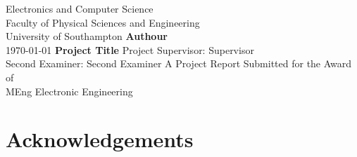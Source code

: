 \documentclass[12pt]{book}
\title{\docTitle{}}
\author{\docAuthor}
\date{\today}
\newcommand{\docSubtitle}{Project Title}
\newcommand{\docAuthor}{Authour}
\newcommand{\docSupervisor}{Supervisor}
\newcommand{\docSecondExaminer}{Second Examiner}
\newcommand{\docDegree}{MEng Electronic Engineering}
\begin{document}
\frontmatter

\begin{titlepage}
\begin{center}
        \vfill
        \Large
        Electronics and Computer Science\\
        Faculty of Physical Sciences and Engineering\\
        University of Southampton
        \vfill
        \huge
        \textbf{\docAuthor{}}\\
        \Large
        \today
        \vfill
        \Huge
        \textbf{\docSubtitle{}}
        \vfill
        \Large
        Project Supervisor: \docSupervisor{}\\
        Second Examiner: \docSecondExaminer{}
        \vfill
        A Project Report Submitted for the Award of\\\docDegree{}
        \vspace{12mm}
\end{center}
\end{titlepage}



\tableofcontents

\chapter{Acknowledgements}


\mainmatter







\appendix
\appendixpage
\addappheadtotoc


\backmatter



\end{document}
